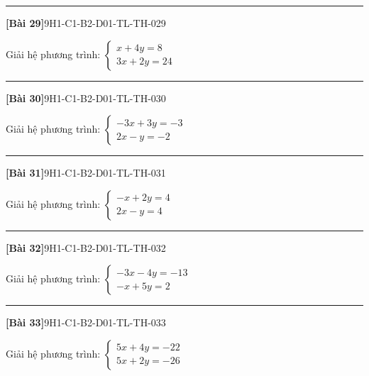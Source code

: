 \documentclass[12pt,a4paper]{article}
\newif\ifloigiai
\newenvironment{cauhoi}[2]{%
  \par\medskip\noindent\rule{\textwidth}{0.4pt}\par\nopagebreak
  \noindent\textbf{[#1]}\hfill{\scriptsize\ttfamily #2}\par\nopagebreak\smallskip}{\par}
\newcommand{\loigiai}[1]{\ifloigiai\par\smallskip\noindent\textit{Lời giải.} #1\par\fi}
\begin{document}
\begin{cauhoi}{Bài 29}{9H1-C1-B2-D01-TL-TH-029}
Giải hệ phương trình: $\begin{cases}x + 4y=8\\ 3x + 2y=24\end{cases}$
\loigiai{Nhân hai vế của phương trình thứ nhất với $1$ và phương trình thứ hai với $-2$ rồi cộng từng vế để khử $y$: $-5x=-40$, suy ra $x=8$. Thay $x=8$ vào phương trình thứ nhất: $1\cdot(8)+4y=8$, suy ra $y=0$. Vậy hệ có nghiệm $(x;y)=(8;0)$.}
\end{cauhoi}
\begin{cauhoi}{Bài 30}{9H1-C1-B2-D01-TL-TH-030}
Giải hệ phương trình: $\begin{cases}-3x + 3y=-3\\ 2x - y=-2\end{cases}$
\loigiai{Nhân hai vế của phương trình thứ nhất với $-1$ và phương trình thứ hai với $-3$ rồi cộng từng vế để khử $y$: $-3x=9$, suy ra $x=-3$. Thay $x=-3$ vào phương trình thứ nhất: $-3\cdot(-3)+3y=-3$, suy ra $y=-4$. Vậy hệ có nghiệm $(x;y)=(-3;-4)$.}
\end{cauhoi}
\begin{cauhoi}{Bài 31}{9H1-C1-B2-D01-TL-TH-031}
Giải hệ phương trình: $\begin{cases}-x + 2y=4\\ 2x - y=4\end{cases}$
\loigiai{Nhân hai vế của phương trình thứ nhất với $-1$ và phương trình thứ hai với $-2$ rồi cộng từng vế để khử $y$: $-3x=-12$, suy ra $x=4$. Thay $x=4$ vào phương trình thứ nhất: $-1\cdot(4)+2y=4$, suy ra $y=4$. Vậy hệ có nghiệm $(x;y)=(4;4)$.}
\end{cauhoi}
\begin{cauhoi}{Bài 32}{9H1-C1-B2-D01-TL-TH-032}
Giải hệ phương trình: $\begin{cases}-3x - 4y=-13\\ -x + 5y=2\end{cases}$
\loigiai{Nhân hai vế của phương trình thứ nhất với $5$ và phương trình thứ hai với $4$ rồi cộng từng vế để khử $y$: $-19x=-57$, suy ra $x=3$. Thay $x=3$ vào phương trình thứ nhất: $-3\cdot(3)-4y=-13$, suy ra $y=1$. Vậy hệ có nghiệm $(x;y)=(3;1)$.}
\end{cauhoi}
\begin{cauhoi}{Bài 33}{9H1-C1-B2-D01-TL-TH-033}
Giải hệ phương trình: $\begin{cases}5x + 4y=-22\\ 5x + 2y=-26\end{cases}$
\loigiai{Nhân hai vế của phương trình thứ nhất với $1$ và phương trình thứ hai với $-2$ rồi cộng từng vế để khử $y$: $-5x=30$, suy ra $x=-6$. Thay $x=-6$ vào phương trình thứ nhất: $5\cdot(-6)+4y=-22$, suy ra $y=2$. Vậy hệ có nghiệm $(x;y)=(-6;2)$.}
\end{cauhoi}
\end{document}

